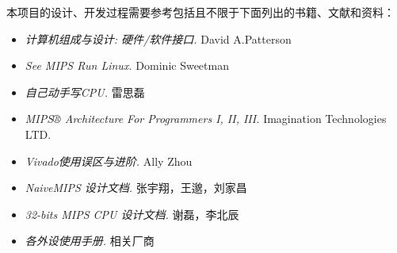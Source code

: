 本项目的设计、开发过程需要参考包括且不限于下面列出的书籍、文献和资料：
\begin{itemize}
    \item \textit{计算机组成与设计: 硬件/软件接口.} David A.Patterson
    \item \textit{See MIPS Run Linux.} Dominic Sweetman
    \item \textit{自己动手写CPU.} 雷思磊
    \item \textit{MIPS® Architecture For Programmers I, II, III.} Imagination Technologies LTD.
    \item \textit{Vivado使用误区与进阶.} Ally Zhou
    \item \textit{NaiveMIPS 设计文档.} 张宇翔，王邈，刘家昌
    \item \textit{32-bits MIPS CPU 设计文档.} 谢磊，李北辰
    \item \textit{各外设使用手册.} 相关厂商
\end{itemize}
